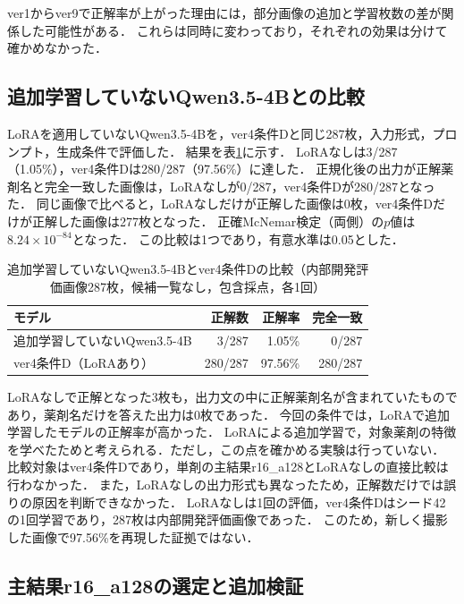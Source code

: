 \documentclass[uplatex,dvipdfmx]{jsarticle}
\begin{document}
ver1からver9で正解率が上がった理由には，部分画像の追加と学習枚数の差が関係した可能性がある．
これらは同時に変わっており，それぞれの効果は分けて確かめなかった．

\subsection{追加学習していないQwen3.5-4Bとの比較}\label{sec:qwen_baseline}

LoRAを適用していないQwen3.5-4Bを，ver4条件Dと同じ287枚，入力形式，プロンプト，生成条件で評価した．
結果を表\ref{tab:qwen_baseline}に示す．
LoRAなしは3/287（1.05\%），ver4条件Dは280/287（97.56\%）に達した．
正規化後の出力が正解薬剤名と完全一致した画像は，LoRAなしが0/287，ver4条件Dが280/287となった．
同じ画像で比べると，LoRAなしだけが正解した画像は0枚，ver4条件Dだけが正解した画像は277枚となった．
正確McNemar検定（両側）の$p$値は$8.24\times10^{-84}$となった．
この比較は1つであり，有意水準は0.05とした．

\begin{table}[htbp]
  \centering
  \caption{追加学習していないQwen3.5-4Bとver4条件Dの比較（内部開発評価画像287枚，候補一覧なし，包含採点，各1回）}
  \label{tab:qwen_baseline}
  \small
  \begin{tabular}{|p{5.2cm}|r|r|r|}
    \hline
    モデル & 正解数 & 正解率 & 完全一致 \\ \hline
    追加学習していないQwen3.5-4B & 3/287 & 1.05\% & 0/287 \\ \hline
    ver4条件D（LoRAあり） & 280/287 & 97.56\% & 280/287 \\ \hline
  \end{tabular}
\end{table}

LoRAなしで正解となった3枚も，出力文の中に正解薬剤名が含まれていたものであり，薬剤名だけを答えた出力は0枚であった．
今回の条件では，LoRAで追加学習したモデルの正解率が高かった．
LoRAによる追加学習で，対象薬剤の特徴を学べたためと考えられる．ただし，この点を確かめる実験は行っていない．
比較対象はver4条件Dであり，単剤の主結果r16\_a128とLoRAなしの直接比較は行わなかった．
また，LoRAなしの出力形式も異なったため，正解数だけでは誤りの原因を判断できなかった．
LoRAなしは1回の評価，ver4条件Dはシード42の1回学習であり，287枚は内部開発評価画像であった．
このため，新しく撮影した画像で97.56\%を再現した証拠ではない．

\subsection{主結果r16\_a128の選定と追加検証}\label{sec:r16a128_addendum}
\end{document}
